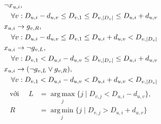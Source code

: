 \documentclass[letterpaper,journal]{IEEEtran}
\begin{document}
\begin{align}
    & \neg x_{u,i}, \notag\\
    & \quad \forall v: D_{u,i} - d_{u,v} \le D_{v,1} \le D_{v,|D_v|} \le D_{u,i} + d_{u,v} \label{eq:forbid_1} \\
    & x_{u,i} \rightarrow g_{v,R}, \notag\\
    & \quad \forall v: D_{u,i} - d_{u,v} \le D_{v,1} \le D_{u,i} + d_{u,v} < D_{v,|D_v|} \label{eq:forbid_2} \\
    & x_{u,i} \rightarrow \neg g_{v,L}, \notag\\
    & \quad \forall v: D_{v,1} < D_{u,i} - d_{u,v} \le D_{v,|D_v|} \le D_{u,i} + d_{u,v} \label{eq:forbid_3} \\
    & x_{u,i} \rightarrow (\neg g_{v,L} \lor g_{v,R}), \notag\\
    & \quad \forall v: D_{v,1} < D_{u,i} - d_{u,v} < D_{u,i} + d_{u,v} < D_{v,|D_v|} \label{eq:forbid_4}
\end{align}
\begin{align*}
    \text{với } \quad L &= \operatorname{arg\,max}\limits_{j} \{ j \mid D_{v,j} < D_{u,i} - d_{u,v} \}, \\
    R &= \operatorname{arg\,min}\limits_{j} \{ j \mid D_{v,j} > D_{u,i} + d_{u,v} \}
\end{align*}
\end{document}
